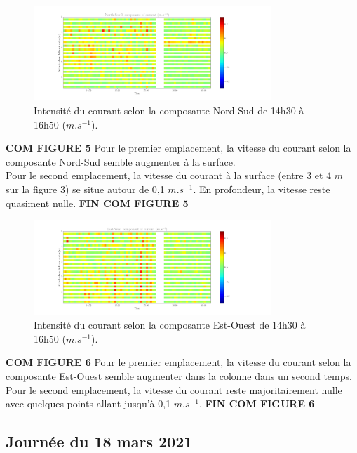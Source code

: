 \documentclass[12pt]{article}
\begin{document}
\begin{figure}[!ht]
	\begin{center}
		\includegraphics[width=0.8\textwidth]{1703F03scatterv2.png}
		\caption{Intensité du courant selon la composante Nord-Sud de 14h30 à 16h50 ($m.s^{-1}$).}
	\end{center}
\end{figure}
\textbf{COM FIGURE 5} Pour le premier emplacement, la vitesse du courant selon la composante Nord-Sud semble augmenter à la surface.\\
\indent Pour le second emplacement, la vitesse du courant à la surface (entre 3 et 4 $m$ sur la figure 3) se situe autour de 0,1 $m.s^{-1}$. En profondeur, la vitesse reste quasiment nulle. \textbf{FIN COM FIGURE 5}\\

\begin{figure}[!ht]
	\begin{center}
		\includegraphics[width=0.8\textwidth]{1703F03scatterv1.png}
		\caption{Intensité du courant selon la composante Est-Ouest de 14h30 à 16h50 ($m.s^{-1}$).}
	\end{center}
\end{figure}
\textbf{COM FIGURE 6} Pour le premier emplacement, la vitesse du courant selon la composante Est-Ouest semble augmenter dans la colonne dans un second temps.\\
\indent Pour le second emplacement, la vitesse du courant reste majoritairement nulle avec quelques points allant jusqu'à 0,1 $m.s^{-1}$. \textbf{FIN COM FIGURE 6}\\
\clearpage 

\subsection{Journée du 18 mars 2021}
\end{document}
